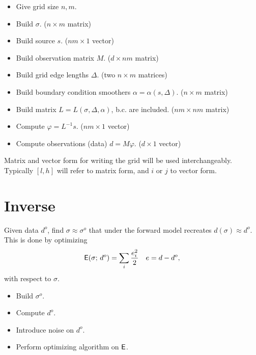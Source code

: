 \documentclass[a4paper,12pt]{article}
\begin{document}
%
\begin{itemize}
\item Give grid size $n,m$.
\item Build $\sigma$. ($n\times m$ matrix)
\item Build source $s$. ($nm\times 1$ vector)
\item Build observation matrix $M$. ($d\times nm$ matrix)
\item Build grid edge lengths $\Delta$. (two $n\times m$ matrices)
\item Build boundary condition smoothers $\alpha=\alpha(s,\Delta)$. ($n\times m$ matrix) 
\item Build matrix $L=L(\sigma,\Delta,\alpha)$, b.c. are included. ($nm\times nm$ matrix)
\item Compute $\varphi=L^{-1}s$. ($nm\times 1$ vector)
\item Compute observations (data) $d = M\varphi$. ($d\times 1$ vector)
\end{itemize}
Matrix and vector form for writing the grid will be used interchangeably. Typically $[l,h]$ will refer to matrix 
form, and $i$ or $j$ to vector form.
\section{Inverse}
Given data $d^o$, find $\sigma\approx\sigma^o$ that under the forward model recreates 
$d(\sigma)\approx d^o$. 
This is done by optimizing
\begin{align*}
{\sf E}(\sigma;\,d^o) &= \sum_i \frac{e_i^2}{2} & e = d-d^o,
\end{align*}
with respect to $\sigma$.
\begin{itemize}
\item Build $\sigma^o$.
\item Compute $d^o$.
\item Introduce noise on $d^o$.
\item Perform optimizing algorithm on ${\sf E}$.
\end{itemize}
\end{document}
